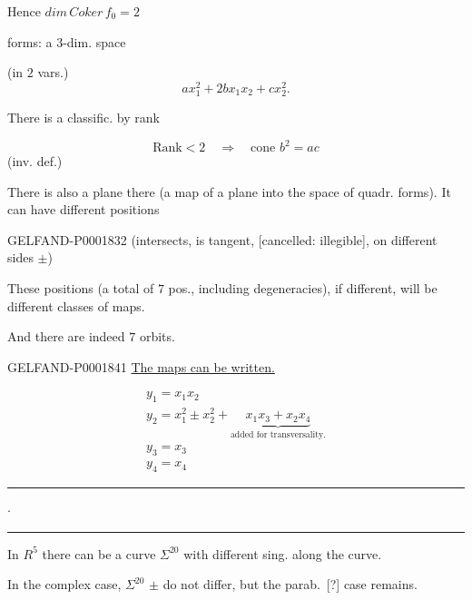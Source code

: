 Hence $dim\, Coker\, f_0=2$

forms: a $3$-dim. space

(in $2$ vars.)
\begin{equation*}ax_1^2+2bx_1x_2+cx_2^2.\end{equation*}

There is a classific. by rank




\begin{equation*}\text{Rank}<2\quad\Longrightarrow\quad\text{cone }b^2=ac\end{equation*}
(inv. def.)

There is also a plane there (a map of a plane into the space of quadr. forms). It can have different positions

\begin{GelfandAdjacentEvidence}{GELFAND-P000183}{2}
(intersects, is tangent, [cancelled: illegible], on different sides $\pm$)
\end{GelfandAdjacentEvidence}

These positions (a total of $7$ pos., including degeneracies), if different, will be different classes of maps.

And there are indeed $7$ orbits.




\begin{GelfandAdjacentEvidence}{GELFAND-P000184}{1}
\underline{The maps can be written.}

\begin{gather*}
y_1=x_1x_2\\
y_2=x_1^2\pm x_2^2+\underbrace{x_1x_3+x_2x_4}_{\text{added for transversality.}}\\
y_3=x_3\\
y_4=x_4
\end{gather*}


\begin{center}\rule{12mm}{.4pt}\kern2mm$\cdot$\kern2mm\rule{12mm}{.4pt}\end{center}

In $R^5$ there can be a curve $\Sigma^{20}$ with different sing. along the curve.

In the complex case, $\Sigma^{20}$ $\pm$ do not differ, but the parab.\, [?] case remains.
\end{GelfandAdjacentEvidence}

